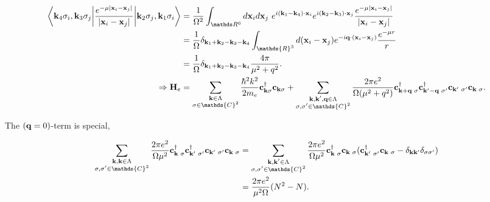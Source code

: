 \begin{equation}
    \begin{split}
        \bigg\langle {{\bf k}_4 \sigma_i, {\bf k}_3 \sigma_j}\bigg| \frac{e^{-\mu |{\bf x}_i - {\bf x}_j|}}{|{\bf x}_i- {\bf x}_j|} \bigg|{{\bf k}_2 \sigma_j, {\bf k}_1 \sigma_i} \bigg\rangle &= \frac{1}{\Omega^2} \int_{\R^6} d{\bf x}_i d{\bf x}_j \blanky e^{i({\bf k}_1 - {\bf k}_4) \cdot {\bf x}_i} e^{i({\bf k}_2 - {\bf k}_3) \cdot {\bf x}_j} \frac{e^{-\mu |{\bf x}_i - {\bf x}_j|}}{|{\bf x}_i- {\bf x}_j|} \\
        &= \frac{1}{\Omega} \delta_{{\bf k}_1+{\bf k}_2 - {\bf k}_3 - {\bf k}_4} \int_{\mathds{R}^3} d({\bf x}_i - {\bf x}_j) e^{-i {\bf q} \cdot ({\bf x}_i-{\bf x}_j)} \frac{e^{-\mu r}}{r} \\
        &= \frac{1}{\Omega} \delta_{{\bf k}_1+{\bf k}_2 - {\bf k}_3 - {\bf k}_4} \frac{4\pi}{\mu^2 + q^2}. \\
    \Rightarrow {\bf H}_e &= \sum_{\substack{{\bf k} \in \Lambda\\
    \sigma \in \mathds{C}^2}} \frac{\hbar^2 k^2}{2m_e} {\bf c}_{{\bf k} \sigma}^\dagger {\bf c}_{{\bf k} \sigma} +  \sum_{\substack{{\bf k},{\bf k}',{\bf q} \in \Lambda\\
    \sigma, \sigma' \in \mathds{C}^2}} \frac{2\pi e^2}{\Omega(\mu^2 + q^2)} {\bf c}_{{\bf k}+{\bf q} \blanky \sigma}^\dagger {\bf c}_{{\bf k}'-{\bf q} \blanky \sigma'}^\dagger {\bf c}_{{\bf k}' \blanky \sigma'} {\bf c}_{{\bf k} \blanky \sigma}.
    \label{pre-HF-jellium H}
    \end{split} 
\end{equation}

The $({\bf q}=0)$-term is special, 

\begin{equation}
    \begin{split}
    \sum_{\substack{{\bf k},{\bf k} \in \Lambda\\
    \sigma, \sigma' \in \mathds{C}^2}} \frac{2\pi e^2}{\Omega\mu^2} {\bf c}_{{\bf k} \blanky \sigma}^\dagger {\bf c}_{{\bf k}' \blanky \sigma'}^\dagger {\bf c}_{{\bf k}' \blanky \sigma'} {\bf c}_{{\bf k} \blanky \sigma} &= \sum_{\substack{{\bf k},{\bf k}' \in \Lambda\\
    \sigma, \sigma' \in \mathds{C}^2}} \frac{2\pi e^2}{\Omega\mu^2} {\bf c}_{{\bf k} \blanky \sigma}^\dagger {\bf c}_{{\bf k} \blanky \sigma} ({\bf c}_{{\bf k}' \blanky \sigma'}^\dagger {\bf c}_{{\bf k} \blanky \sigma} - \delta_{{\bf k}{\bf k}'} \delta_{\sigma \sigma'}) \\
    &= \frac{2 \pi e^2}{\mu^2 \Omega} (N^2 - N).
    \end{split}
\end{equation}

